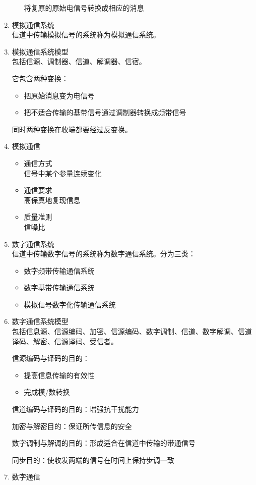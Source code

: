 \documentclass[UTF8]{ctexrep}
\begin{document}
\begin{enumerate}
\begin{itemize}
将复原的原始电信号转换成相应的消息
\end{itemize}
\item 模拟通信系统\\
信道中传输模拟信号的系统称为模拟通信系统。
\item 模拟通信系统模型\\
包括信源、调制器、信道、解调器、信宿。\par
它包含两种变换：
\begin{itemize}
\item 把原始消息变为电信号
\item 把不适合传输的基带信号通过调制器转换成频带信号
\end{itemize}
同时两种变换在收端都要经过反变换。
\item 模拟通信
\begin{itemize}
\item 通信方式\\
信号中某个参量连续变化
\item 通信要求\\
高保真地复现信息
\item 质量准则\\
信噪比
\end{itemize}
\item 数字通信系统\\
信道中传输数字信号的系统称为数字通信系统。分为三类：
\begin{itemize}
\item 数字频带传输通信系统
\item 数字基带传输通信系统
\item 模拟信号数字化传输通信系统
\end{itemize}
\item 数字通信系统模型\\
包括信息源、信源编码、加密、信源编码、数字调制、信道、数字解调、信道译码、解密、信源译码、受信者。\par
信源编码与译码的目的：
\begin{itemize}
\item 提高信息传输的有效性
\item 完成模/数转换
\end{itemize}
信道编码与译码的目的：增强抗干扰能力\par
加密与解密目的：保证所传信息的安全\par
数字调制与解调的目的：形成适合在信道中传输的带通信号\par
同步目的：使收发两端的信号在时间上保持步调一致
\item 数字通信
\begin{itemize}

\end{itemize}
\end{enumerate}
\end{document}
